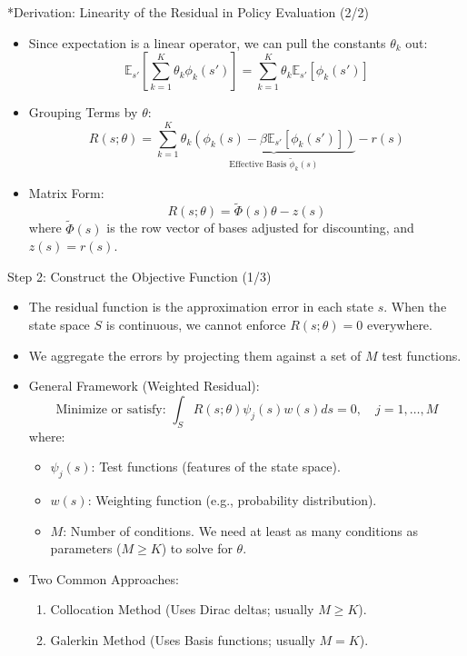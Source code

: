 \documentclass[aspectratio=169]{beamer}
\newcommand{\1}{\mathbf{1}}
\begin{document}
\begin{frame}{*Derivation: Linearity of the Residual in Policy Evaluation (2/2)}
    \begin{itemize}
    \item Since expectation is a linear operator, we can pull the constants $\theta_k$ out:
    $$ \mathbb{E}_{s'} \left[ \sum_{k=1}^K \theta_k \phi_k(s') \right] = \sum_{k=1}^K \theta_k \mathbb{E}_{s'} [\phi_k(s')] $$

    \item Grouping Terms by $\theta$:
    $$ R(s; \theta) = \sum_{k=1}^K \theta_k \underbrace{\left( \phi_k(s) - \beta \mathbb{E}_{s'} [\phi_k(s')] \right)}_{\text{Effective Basis } \tilde{\phi}_k(s)} - r(s) $$

    \item Matrix Form:
    $$ R(s; \theta) = \tilde{\Phi}(s) \theta - z(s) $$
    where $\tilde{\Phi}(s)$ is the row vector of bases adjusted for discounting, and $z(s) = r(s)$.
\end{itemize}
\end{frame}

\begin{frame}{Step 2: Construct the Objective Function (1/3)}
    \small
        \begin{itemize}
        \item The residual function is the approximation error in each state $s$. When the state space $S$ is continuous, we cannot enforce $R(s; \theta) = 0$ everywhere.
        \item We aggregate the errors by projecting them against a set of $M$ test functions.
        \item General Framework (Weighted Residual):
        $$ \text{Minimize or satisfy: } \int_S R(s; \theta) \psi_j(s) w(s) ds = 0, \quad j=1,\dots,M $$
        where:
        \begin{itemize}
            \item $\psi_j(s)$: Test functions (features of the state space).
            \item $w(s)$: Weighting function (e.g., probability distribution).
            \item $M$: Number of conditions. We need at least as many conditions as parameters ($M \ge K$) to solve for $\theta$.
        \end{itemize}
        \item Two Common Approaches:
        \begin{enumerate}
            \item Collocation Method (Uses Dirac deltas; usually $M \ge K$).
            \item Galerkin Method (Uses Basis functions; usually $M = K$).
        \end{enumerate}
    
        \end{itemize}
    \end{frame}
    
\end{document}
